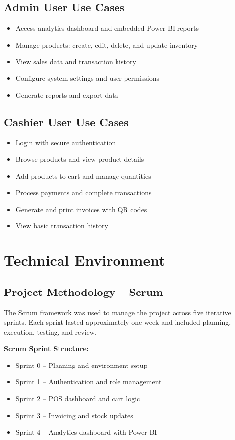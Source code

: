 \subsection*{Admin User Use Cases}
\begin{itemize}
  \item Access analytics dashboard and embedded Power BI reports
  \item Manage products: create, edit, delete, and update inventory
  \item View sales data and transaction history
  \item Configure system settings and user permissions
  \item Generate reports and export data
\end{itemize}

\subsection*{Cashier User Use Cases}
\begin{itemize}
  \item Login with secure authentication
  \item Browse products and view product details
  \item Add products to cart and manage quantities
  \item Process payments and complete transactions
  \item Generate and print invoices with QR codes
  \item View basic transaction history
\end{itemize}

\section{Technical Environment}

\subsection{Project Methodology – Scrum}

The Scrum framework was used to manage the project across five iterative sprints. Each sprint lasted approximately one week and included planning, execution, testing, and review.

\textbf{Scrum Sprint Structure:}
\begin{itemize}
  \item Sprint 0 – Planning and environment setup
  \item Sprint 1 – Authentication and role management
  \item Sprint 2 – POS dashboard and cart logic
  \item Sprint 3 – Invoicing and stock updates
  \item Sprint 4 – Analytics dashboard with Power BI
\end{itemize}

